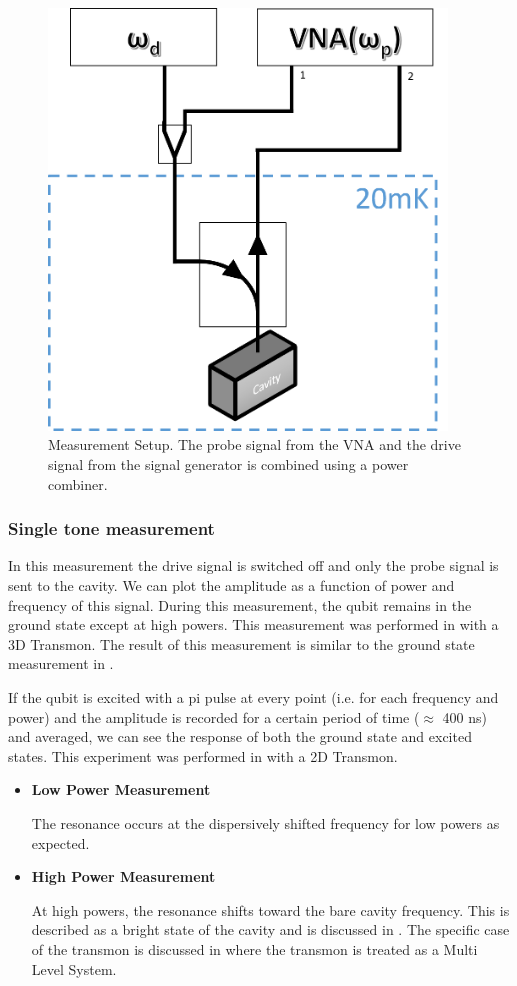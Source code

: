 \begin{figure}
\centering
\includegraphics[width=400px]{Figures/measurement_circuit.png}
\decoRule
\caption[Measurement Setup]{Measurement Setup. The probe signal from the VNA and the drive signal from the signal generator is combined using a power combiner.}
\label{fig:measurement setup}
\end{figure}

\subsubsection{Single tone measurement}

In this measurement the drive signal is switched off and only the probe signal is sent to the cavity. We can plot the amplitude as a function of power and frequency of this signal. During this measurement, the qubit remains in the ground state except at high powers. This measurement was performed in \cite{Paik2011} with a 3D Transmon. The result of this measurement is similar to the ground state measurement in \cite{Reed2010}.

If the qubit is excited with a pi pulse at every point (i.e. for each frequency and power) and the amplitude is recorded for a certain period of time ($\approx$ 400 ns) and averaged, we can see the response of both the ground state and excited states. This experiment was performed in \cite{Reed2010} with a 2D Transmon.

\begin{itemize}
\item \textbf{Low Power Measurement}

The resonance occurs at the dispersively shifted frequency for low powers as expected.

\item \textbf{High Power Measurement}

At high powers, the resonance shifts toward the bare cavity frequency. This is described as a bright state of the cavity and is discussed in \cite{Bishop2010}. The specific case of the transmon is discussed in \cite{Boissonneault2010} where the transmon is treated as a Multi Level System.
\end{itemize}


